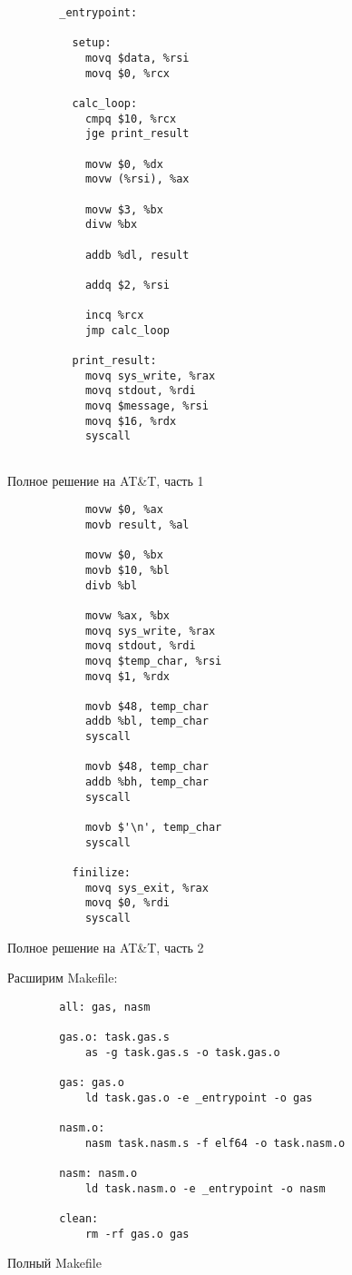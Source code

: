 \documentclass[a4paper]{article}
\begin{document}
\begin{listing}[H]
\begin{verbatim}
        _entrypoint:
        
          setup:
            movq $data, %rsi  
            movq $0, %rcx
        
          calc_loop:
            cmpq $10, %rcx
            jge print_result
        
            movw $0, %dx
            movw (%rsi), %ax
        
            movw $3, %bx
            divw %bx
        
            addb %dl, result
        
            addq $2, %rsi
        
            incq %rcx
            jmp calc_loop
        
          print_result:
            movq sys_write, %rax
            movq stdout, %rdi
            movq $message, %rsi
            movq $16, %rdx
            syscall
        
    \end{verbatim}
    \caption{Полное решение на AT\&T, часть 1}
  \end{listing}

  \begin{listing}[H]
    \begin{verbatim} 
            movw $0, %ax
            movb result, %al
         
            movw $0, %bx 
            movb $10, %bl
            divb %bl
        
            movw %ax, %bx
            movq sys_write, %rax
            movq stdout, %rdi
            movq $temp_char, %rsi
            movq $1, %rdx
        
            movb $48, temp_char
            addb %bl, temp_char
            syscall
        
            movb $48, temp_char
            addb %bh, temp_char
            syscall
            
            movb $'\n', temp_char
            syscall
        
          finilize:
            movq sys_exit, %rax
            movq $0, %rdi
            syscall        
    \end{verbatim}
    \caption{Полное решение на AT\&T, часть 2}
  \end{listing}

  Расширим Makefile:
  \begin{listing}[H]
    \begin{verbatim}
        all: gas, nasm

        gas.o: task.gas.s
            as -g task.gas.s -o task.gas.o

        gas: gas.o
            ld task.gas.o -e _entrypoint -o gas

        nasm.o:
            nasm task.nasm.s -f elf64 -o task.nasm.o

        nasm: nasm.o
            ld task.nasm.o -e _entrypoint -o nasm

        clean:
            rm -rf gas.o gas
    \end{verbatim}
    \caption{Полный Makefile}
  \end{listing}
\end{document}
